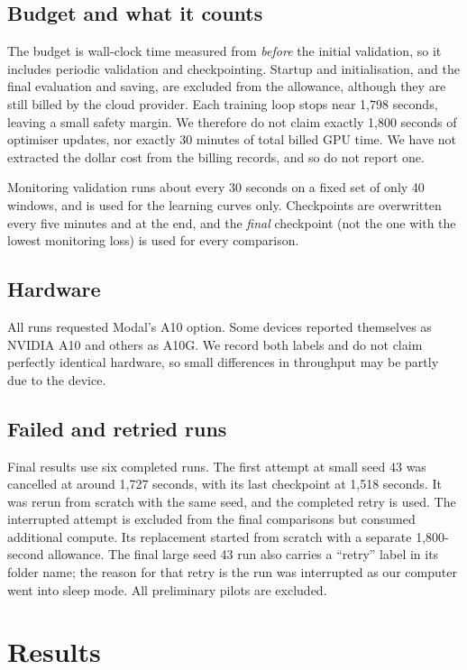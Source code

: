 \documentclass[11pt,a4paper]{article}
\begin{document}
\subsection{Budget and what it counts}
\label{sec:budget}
The budget is wall-clock time measured from \emph{before} the initial validation, so it includes periodic validation and checkpointing. Startup and initialisation, and the final evaluation and saving, are excluded from the allowance, although they are still billed by the cloud provider. Each training loop stops near 1,798 seconds, leaving a small safety margin. We therefore do not claim exactly 1,800 seconds of optimiser updates, nor exactly 30 minutes of total billed GPU time. We have not extracted the dollar cost from the billing records, and so do not report one.

Monitoring validation runs about every 30 seconds on a fixed set of only 40 windows, and is used for the learning curves only. Checkpoints are overwritten every five minutes and at the end, and the \emph{final} checkpoint (not the one with the lowest monitoring loss) is used for every comparison.

\subsection{Hardware}
All runs requested Modal's A10 option. Some devices reported themselves as NVIDIA A10 and others as A10G. We record both labels and do not claim perfectly identical hardware, so small differences in throughput may be partly due to the device.

\subsection{Failed and retried runs}
Final results use six completed runs. The first attempt at small seed 43 was cancelled at around 1,727 seconds, with its last checkpoint at 1,518 seconds. It was rerun from scratch with the same seed, and the completed retry is used. The interrupted attempt is excluded from the final comparisons but consumed additional compute. Its replacement started from scratch with a separate 1,800-second allowance. The final large seed 43 run also carries a ``retry'' label in its folder name; the reason for that retry is the run was interrupted as our computer went into sleep mode. All preliminary pilots are excluded.

\section{Results}
\end{document}
